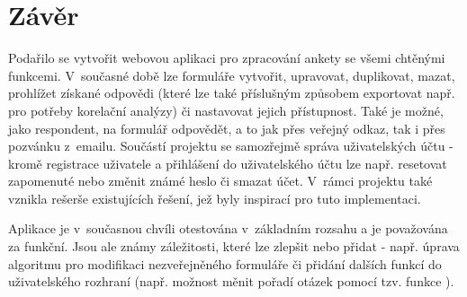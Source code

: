 \chapter{Závěr}
Podařilo se vytvořit webovou aplikaci pro zpracování ankety se všemi chtěnými funkcemi. V~současné době lze formuláře vytvořit, upravovat, duplikovat, mazat, prohlížet získané odpovědi (které lze také příslušným způsobem exportovat např. pro potřeby korelační analýzy) či nastavovat jejich přístupnost. Také je možné, jako respondent, na formulář odpovědět, a to jak přes veřejný odkaz, tak i přes pozvánku z~emailu. Součástí projektu se samozřejmě správa uživatelských účtu - kromě registrace uživatele a přihlášení do uživatelského účtu lze např. resetovat zapomenuté nebo změnit známé heslo či smazat účet. V~rámci projektu také vznikla rešerše existujících řešení, jež byly inspirací pro tuto implementaci.

Aplikace je v~současnou chvíli otestována v~základním rozsahu a je považována za funkční. Jsou ale známy záležitosti, které lze zlepšit nebo přidat - např. úprava algoritmu pro modifikaci nezveřejněného formuláře či přidání dalších funkcí do uživatelského rozhraní (např. možnost měnit pořadí otázek pomocí tzv. funkce ).
